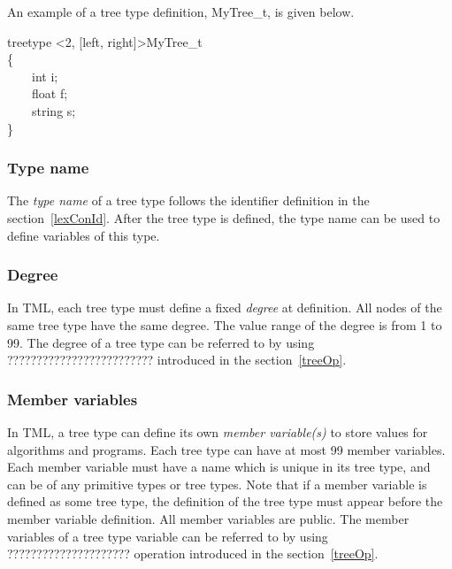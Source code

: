 \documentclass[12pt,psfig,a4]{article}
\begin{document}
An example of a tree type definition, MyTree\_t, is given below.

\begin{code}
\begin{tabbing}
treetype \textless2, [left, right]\textgreater MyTree\_t \\
\{\\
~~~~int i;\\
~~~~float f;\\
~~~~string s;\\
\}
\end{tabbing}
\end{code}


\subsubsection {Type name}
The \textit{type name} of a tree type follows the identifier definition in the section~\ref{lexConId}. After the tree type is defined, the type name can be used to define variables of this type.

\subsubsection {Degree}
In TML, each tree type must define a fixed \textit{degree} at definition. All nodes of the same tree type have the same degree. The value range of the degree is from 1 to 99. The degree of a tree type can be referred to by using  ????????????????????????? introduced in the section~\ref{treeOp}.


\subsubsection {Member variables}
In TML, a tree type can define its own \textit{member variable(s)} to store values for algorithms and programs. Each tree type can have at most 99 member variables. Each member variable must have a name which is unique in its tree type, and can be of any primitive types or tree types. Note that if a member variable is defined as some tree type, the definition of the tree type must appear before the member variable definition. All member variables are public. The member variables of a tree type variable can be referred to by using  ????????????????????? operation introduced in the section~\ref{treeOp}.

\end{document}
